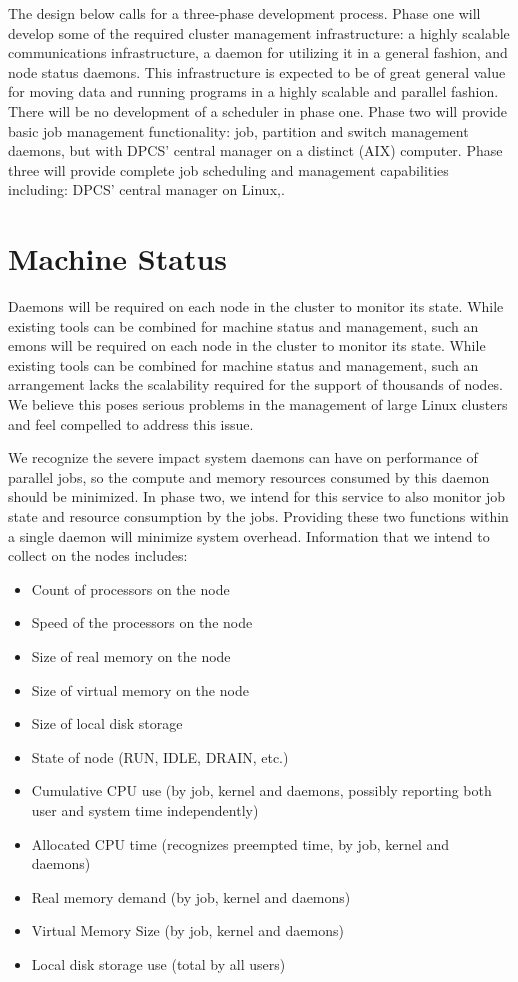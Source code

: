 The design below calls for a three-phase development process. Phase one will
develop some of the required cluster management infrastructure: a highly
scalable communications infrastructure, a daemon for utilizing it in a general
fashion, and node status daemons. This infrastructure is expected to be of
great general value for moving data and running programs in a highly scalable
and parallel fashion. There will be no development of a scheduler in phase one.
Phase two will provide basic job management functionality: job, partition and
switch management daemons, but with DPCS' central manager on a distinct (AIX)
computer. Phase three will provide complete job scheduling and management
capabilities including: DPCS' central manager on Linux,.



\section{Machine Status}

Daemons will be required on each node in the cluster to monitor its state.
While existing tools can be combined for machine status and management, such an
emons will be required on each node in the cluster to monitor its state.
While existing tools can be combined for machine status and management, such an
arrangement lacks the scalability required for the support of thousands of
nodes. We believe this poses serious problems in the management of large Linux
clusters and feel compelled to address this issue. 

We recognize the severe impact system daemons can have on performance of
parallel jobs, so the compute and memory resources consumed by this daemon
should be minimized. In phase two, we intend for this service to also monitor
job state and resource consumption by the jobs. Providing these two functions
within a single daemon will minimize system overhead. Information that we
intend to collect on the nodes includes:

\begin{itemize}
\item Count of processors on the node
\item Speed of the processors on the node
\item Size of real memory on the node
\item Size of virtual memory on the node
\item Size of local disk storage
\item State of node (RUN, IDLE, DRAIN, etc.)
\item Cumulative CPU use (by job, kernel and daemons, possibly reporting 
both user and system time independently)
\item Allocated CPU time (recognizes preempted time, by job, kernel and daemons)
\item Real memory demand (by job, kernel and daemons)
\item Virtual Memory Size (by job, kernel and daemons)
\item Local disk storage use (total by all users)
\end{itemize}


